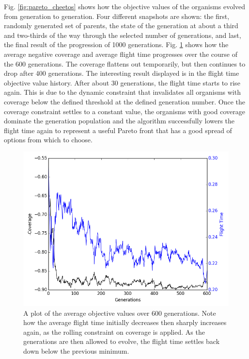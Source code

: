 \documentclass[letterpaper, 10 pt, conference]{ieeeconf}  %
\begin{document}
Fig. \ref{fig:pareto_cheetos} shows how the objective values of the organisms evolved from generation to generation. Four different snapshots are shown: the first, randomly generated set of parents, the state of the generation at about a third and two-thirds of the way through the selected number of generations, and last, the final result of the progression of 1000 generations. Fig. \ref{fig:objectives} shows how the average negative coverage and average flight time progresses over the course of the 600 generations. The coverage flattens out temporarily, but then continues to drop after 400 generations. The interesting result displayed is in the flight time objective value history. After about 30 generations, the flight time starts to rise again. This is due to the dynamic constraint that invalidates all organisms with coverage below the defined threshold at the defined generation number. Once the coverage constraint settles to a constant value, the organisms with good coverage dominate the generation population and the algorithm successfully lowers the flight time again to represent a useful Pareto front that has a good spread of options from which to choose.

\begin{figure}
\centering
\includegraphics[width=0.8\linewidth]{figures/fitness.png}
\caption{A plot of the average objective values over 600 generations. Note how the average flight time initially decreases then sharply increases again, as the rolling constraint on coverage is applied. As the generations are then allowed to evolve, the flight time settles back down below the previous minimum.}
\label{fig:objectives}
\end{figure}
\end{document}
